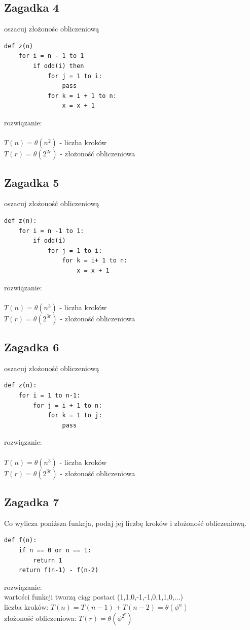 \documentclass{article}
\begin{document}
\subsection*{Zagadka 4}
oszacuj złożonośc obliczeniową
\begin{lstlisting}
def z(n)
	for i = n - 1 to 1
		if odd(i) then
			for j = 1 to i:
				pass
			for k = i + 1 to n:
				x = x + 1
\end{lstlisting}
rozwiązanie: \\\\
$T(n) = \theta(n^2)$ - liczba kroków\\
$T(r) = \theta(2^{2r})$ - złożoność obliczeniowa

\subsection*{Zagadka 5}
oszacuj złożoność obliczeniową
\begin{lstlisting}
def z(n):
	for i = n -1 to 1:
		if odd(i)
			for j = 1 to i:
				for k = i+ 1 to n:
					x = x + 1
\end{lstlisting}
rozwiązanie: \\\\
$T(n) = \theta(n^3)$ - liczba kroków\\
$T(r) = \theta(2^{3r})$ - złożoność obliczeniowa

\subsection*{Zagadka 6}
oszacuj złożoność obliczeniową
\begin{lstlisting}
def z(n):
	for i = 1 to n-1:
		for j = i + 1 to n:
			for k = 1 to j:
				pass
\end{lstlisting}
rozwiązanie: \\\\
$T(n) = \theta(n^3)$ - liczba kroków\\
$T(r) = \theta(2^{3r})$ - złożoność obliczeniowa

\subsection*{Zagadka 7}
Co wylicza poniższa funkcja,  podaj jej liczbę kroków i złożoność obliczeniową.

\begin{lstlisting}
def f(n):
	if n == 0 or n == 1:
		return 1
	return f(n-1) - f(n-2)
\end{lstlisting}
rozwiązanie:\\
wartości funkcji tworzą ciąg postaci (1,1,0,-1,-1,0,1,1,0,...) \\
liczba kroków: $T(n) = T(n-1) + T(n-2) = \theta(\phi^n)$ \\
złożoność obliczeniowa: $T(r) = \theta(\phi^{2^r})$
\end{document}
